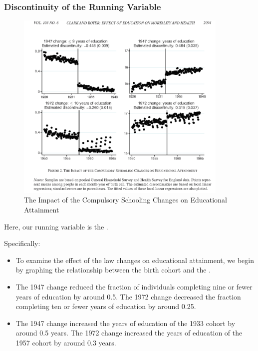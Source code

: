         \subsubsection{Discontinuity of the Running Variable}
            \begin{figure}[H]
                \centering
                \includegraphics[width=4in]{images/ch3/36.png}
                \caption{The Impact of the Compulsory Schooling Changes on Educational Attainment}
            \end{figure}
            Here, our running variable is the .
    
            Specifically:
            \begin{itemize}
                \item To examine the effect of the law changes on educational attainment, we begin by graphing the relationship between the birth cohort and the .
                \item The 1947 change reduced the fraction of individuals completing nine or fewer years of education by around 0.5. The 1972 change decreased the fraction completing ten or fewer years of education by around 0.25.
                \item The 1947 change increased the years of education of the 1933 cohort by around 0.5 years. The 1972 change increased the years of education of the 1957 cohort by around 0.3 years.
            \end{itemize}

